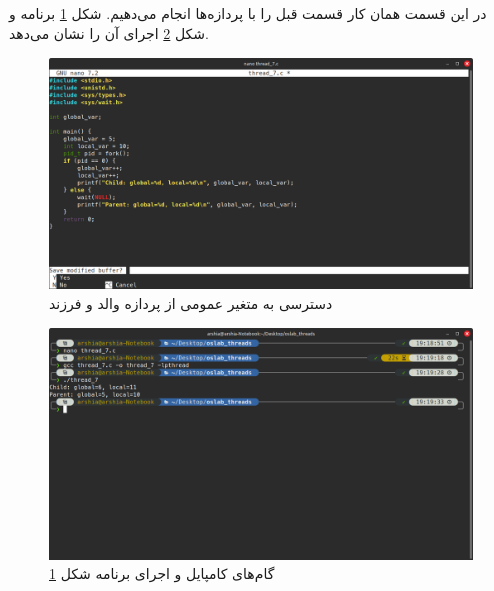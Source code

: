 \documentclass[12pt]{article}
\begin{document}
	\subsection{}
	در این قسمت همان کار قسمت قبل را با پردازه‌ها انجام می‌دهیم. شکل \ref{img:13} برنامه و شکل \ref{img:14} اجرای آن را نشان می‌دهد.
	\begin{figure}[H]
		\centering
		\includegraphics[width=\textwidth]{report7-resources/13.png}
		\caption{دسترسی به متغیر عمومی از پردازه والد و فرزند}
		\label{img:13}
	\end{figure}
	\begin{figure}[H]
		\centering
		\includegraphics[width=\textwidth]{report7-resources/14.png}
		\caption{گام‌های کامپایل و اجرای برنامه شکل \ref{img:13}}
		\label{img:14}
	\end{figure}
	\newpage
\end{document}
